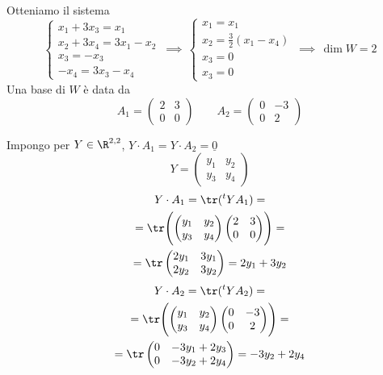 {    Otteniamo il sistema \[
      \begin{cases}
          x_1+3x_3=x_1 \\
          x_2+3x_4=3x_1-x_2\\
          x_3=-x_3\\
          -x_4=3x_3-x_4
      \end{cases} \,\implies\, \begin{cases}
        x_1=x_1\\
        x_2=\frac{3}{2}(x_1-x_4)\\
        x_3=0 \\
        x_3=0
      \end{cases} \,\implies\, \dim  W =2
    \]
      Una base di $ W $ è data da \[
          A_1=\begin{pmatrix}
              2 & 3\\
              0 & 0
          \end{pmatrix}\qquad A_2=\begin{pmatrix}
              0 & -3 \\ 0 & 2
          \end{pmatrix}
      \]

      Impongo per $ Y \in \R^{2,2} $, $ Y \cdot A_1= Y \cdot A_2 = \underline{0}$
      \[
          Y=\begin{pmatrix}
              y_1 & y_2 \\
              y_3 & y_4
          \end{pmatrix}
      \] \begin{multline*}
          Y \cdot A_1=\tr (\null^{t}Y A_1)= \\=\tr\Biggl(\begin{pmatrix}
            y_1 & y_2 \\
            y_3 & y_4
        \end{pmatrix} \begin{pmatrix}
            2 & 3\\
            0 & 0
        \end{pmatrix}\Biggr)=\\
        =\tr \begin{pmatrix}
            2y_1 & 3y_1 \\ 2y_2 & 3y_2
        \end{pmatrix}= 2y_1+3y_2
    \end{multline*}
    \begin{multline*}
        Y \cdot A_2=\tr (\null^{t}Y A_2)= \\=\tr\Biggl(\begin{pmatrix}
          y_1 & y_2 \\
          y_3 & y_4
      \end{pmatrix} \begin{pmatrix}
        0 & -3 \\ 0 & 2
    \end{pmatrix}\Biggr)=\\
      =\tr \begin{pmatrix}
          0 & -3y_1+2y_3 \\ 0 & -3y_2+2y_4
      \end{pmatrix}= -3y_2+2y_4
  \end{multline*}

}
